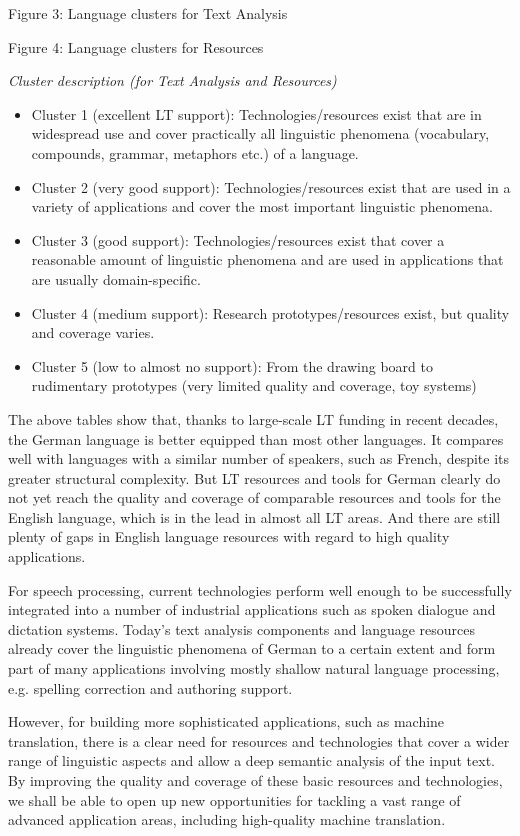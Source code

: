 \documentclass[]{../metanetpaper}
\begin{document}
\begin{Parallel}[c]{80mm}{80mm}
{    Figure 3: Language clusters for Text Analysis

    Figure 4: Language clusters for Resources

    \textit{Cluster description (for Text Analysis and Resources)}
    \begin{itemize}
      \item Cluster 1 (excellent LT support): Technologies/resources exist that are in widespread use and cover practically all linguistic phenomena (vocabulary, compounds, grammar, metaphors etc.) of a language.
      \item Cluster 2 (very good support): Technologies/resources exist that are used in a variety of applications and cover the most important linguistic phenomena. 
      \item Cluster 3 (good support): Technologies/resources exist that cover a reasonable amount of linguistic phenomena and are used in applications that are usually domain-specific.
      \item Cluster 4 (medium support): Research prototypes/resources exist, but quality and coverage varies.
      \item Cluster 5 (low to almost no support): From the drawing board to rudimentary prototypes (very limited quality and coverage, toy systems)
    \end{itemize}
    The above tables show that, thanks to large-scale LT funding in recent decades, the German language is better equipped than most other languages. It compares well with languages with a similar number of speakers, such as French, despite its greater structural complexity. But LT resources and tools for German clearly do not yet reach the quality and coverage of comparable resources and tools for the English language, which is in the lead in almost all LT areas. And there are still plenty of gaps in English language resources with regard to high quality applications.

    For speech processing, current technologies perform well enough to be successfully integrated into a number of industrial applications such as spoken dialogue and dictation systems. Today’s text analysis components and language resources already cover the linguistic phenomena of German to a certain extent and form part of many applications involving mostly shallow natural language processing, e.g. spelling correction and authoring support.

    However, for building more sophisticated applications, such as machine translation, there is a clear need for resources and technologies that cover a wider range of linguistic aspects and allow a deep semantic analysis of the input text. By improving the quality and coverage of these basic resources and technologies, we shall be able to open up new opportunities for tackling a vast range of advanced application areas, including high-quality machine translation.
  }


\end{Parallel}
\end{document}
